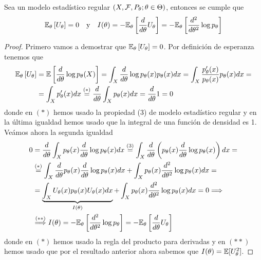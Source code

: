 \begin{prop}
    Sea un modelo estadístico regular $(X, \mathcal{F}, P_{\theta}; \theta \in \Theta)$, entonces se cumple que
    \begin{equation*}
        \mathbb{E}_{\theta} \left[ U_{\theta} \right] = 0 \quad \text{y} \quad I(\theta) = -\mathbb{E}_{\theta} \left[ \dfrac{d}{d\theta} U_{\theta} \right]= -\mathbb{E}_{\theta}\left[\dfrac{d^2}{d\theta^2}\log p_{\theta}\right]
    \end{equation*}
    \begin{proof}
        Primero vamos a demostrar que $\mathbb{E}_{\theta} \left[ U_{\theta} \right] = 0$. Por definición de esperanza tenemos que
        \begin{align*}
            \mathbb{E}_{\theta} \left[ U_{\theta} \right] &= \mathbb{E}\left[\dfrac{d}{d\theta} \log p_{\theta}(X)\right] = \int_{X} \dfrac{d}{d\theta} \log p_{\theta}(x) p_{\theta}(x) dx= \int_{X} \dfrac{p'_\theta(x)}{p_{\theta}(x)}p_{\theta}(x) dx = \\
            &= \int_{X} p'_{\theta}(x) dx \overset{(*)}{=} \dfrac{d}{d\theta} \int_{X} p_{\theta}(x) dx = \dfrac{d}{d\theta} 1 = 0
        \end{align*}
        donde en $(*)$ hemos usado la propiedad (3) de modelo estadístico regular y en la última igualdad hemos usado que la integral de una función de densidad es 1. \\
        Veámos ahora la segunda igualdad
        \begin{align*}
            0&=\dfrac{d}{d\theta}\int_{X}p_{\theta}(x) \dfrac{d}{d\theta} \log p_{\theta}(x)  dx \overset{(3)}{=} \int_{X} \dfrac{d}{d\theta} \left( p_{\theta}(x) \dfrac{d}{d\theta} \log p_{\theta}(x) \right) dx =  \\
            &\overset{(*)}{=}\int_{X}  \dfrac{d}{d\theta} p_{\theta}(x) \dfrac{d}{d\theta} \log p_{\theta}(x)dx + \int_{X}p_{\theta}(x) \dfrac{d^2}{d\theta^2} \log p_{\theta}(x) dx = \\
            &= \underbrace{\int_{X}  U_{\theta}(x)p_{\theta}(x)U_{\theta}(x) dx}_{I(\theta)} + \int_{X}p_{\theta}(x) \dfrac{d^2}{d\theta^2} \log p_{\theta}(x) dx=0 \Longrightarrow \\
            & \overset{(**)}{\Longrightarrow} I(\theta)= -\mathbb{E}_{\theta}\left[\dfrac{d^2}{d\theta^2}\log p_{\theta}\right]=-\mathbb{E}_{\theta} \left[ \dfrac{d}{d\theta} U_{\theta} \right]
        \end{align*}
        donde en $(*)$ hemos usado la regla del producto para derivadas y en $(**)$ hemos usado que por el resultado anterior ahora sabemos que $I(\theta)=\mathbb{E}[U_{\theta}^2]$.
    \end{proof}
\end{prop}

